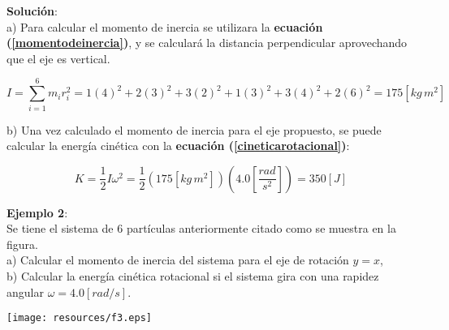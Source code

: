 \documentclass[letter,11pt]{article}
\begin{document}
\begin{minipage}[b]{.9\linewidth}
\textbf{Solución}:\\
a) Para calcular el momento de inercia se utilizara la \textbf{ecuación
(\ref{momentodeinercia})}, y se calculará la distancia perpendicular
aprovechando que el eje es vertical.

\begin{equation*}
    I = \sum_{i=1}^{6} m_i r^2_i = 1 (4)^2 + 2(3)^2 + 3(2)^2 + 1(3)^2 + 3(4)^2 + 2(6)^2 = 175 [kg\, m^2]
\end{equation*}

b) Una vez calculado el momento de inercia para el eje propuesto, se puede
calcular la energía cinética con la \textbf{ecuación
(\ref{cineticarotacional})}:

\begin{equation*}
    K = \frac{1}{2} I \omega^2 =  \frac{1}{2} \left(175 [kg\, m^2]\right) \left(4.0 \left[\frac{rad}{s^2}\right]\right) = 350 [J]
\end{equation*}
\end{minipage}

\vspace{0.75cm}
\begin{minipage}[b]{.4\linewidth}
\textbf{Ejemplo 2}:\\
Se tiene el sistema de 6 partículas anteriormente citado como se muestra en la
figura. \\

a) Calcular el momento de inercia del sistema para el eje de rotación $y = x$, \\
b) Calcular la energía cinética rotacional si el sistema gira con una rapidez
angular $\omega = 4.0 [rad/s]$.
\end{minipage}\hfill
\begin{minipage}{.5\linewidth}
\texttt{[image: resources/f3.eps]}
\end{minipage}
\end{document}
